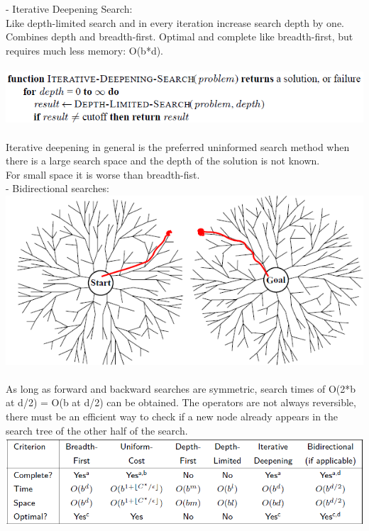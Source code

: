 \documentclass{article}
\begin{document}
- Iterative Deepening Search:\\
Like depth-limited search and in every iteration increase search depth by one. Combines depth and breadth-first. Optimal and complete like breadth-first, but requires much less memory: O(b*d).\\\\
\includegraphics[scale=0.6]{15.png}\\\\
Iterative deepening in general is the preferred uninformed search method when there is a large search space and the depth of the solution is not known.\\
For small space it is worse than breadth-fist.\\
- Bidirectional searches:\\
\includegraphics[scale=0.6]{16.png}\\\\
As long as forward and backward searches are symmetric, search times of O(2*b at d/2) = O(b at d/2) can be obtained. The operators are not always reversible, there must be an efficient way to check if a new node already appears in the search tree of the other half of the search.\\
\includegraphics[scale=0.6]{17.png}
\end{document}
